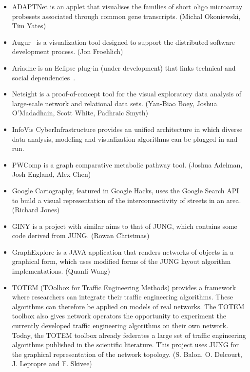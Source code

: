 \begin{enumerate}
\begin{itemize}
\item ADAPTNet is an applet that visualises the families of short oligo microarray probesets associated through common gene transcripts. (Michal Okoniewski, Tim Yates)~\cite{ADAPTNET}

\item Augur~\cite{AUGUR} is a visualization tool designed to support the distributed software development process. (Jon Froehlich)~\cite{AUGUR_2}

\item Ariadne is an Eclipse plug-in (under development) that links technical and social dependencies~\cite{ARIADNE}.

\item Netsight is a proof-of-concept tool for the visual exploratory data analysis of large-scale network and relational data sets. (Yan-Biao Boey, Joshua O'Madadhain, Scott White, Padhraic Smyth)~\cite{NETSIGHT}

\item InfoVis CyberInfrastructure provides an unified architecture in which diverse data analysis, modeling and visualization algorithms can be plugged in and run.~\cite{INFOVIS_CYBERINFRASTRUCTURE}

\item PWComp is a graph comparative metabolic pathway tool. (Joshua Adelman, Josh England, Alex Chen)~\cite{PWCOMP}

\item Google Cartography, featured in Google Hacks, uses the Google Search API to build a visual representation of the interconnectivity of streets in an area. (Richard Jones)~\cite{GOOGLE_CARTOGRAPHY}

\item GINY is a project with similar aims to that of JUNG, which contains some code derived from JUNG. (Rowan Christmas)~\cite{GINY}

\item GraphExplore is a JAVA application that renders networks of objects in a graphical form, which uses modified forms of the JUNG layout algorithm implementations. (Quanli Wang)~\cite{GRAPHEXPLORER}

\item TOTEM (TOolbox for Traffic Engineering Methods) provides a framework where researchers can integrate their traffic engineering algorithms. These algorithms can therefore be applied on models of real networks. The TOTEM toolbox also gives network operators the opportunity to experiment the currently developed traffic engineering algorithms on their own network. Today, the TOTEM toolbox already federates a large set of traffic engineering algorithms published in the scientific literature. This project uses JUNG for the graphical representation of the network topology. (S. Balon, O. Delcourt, J. Lepropre and F. Skivee)~\cite{TOTEM}


\end{itemize}
\end{enumerate}
